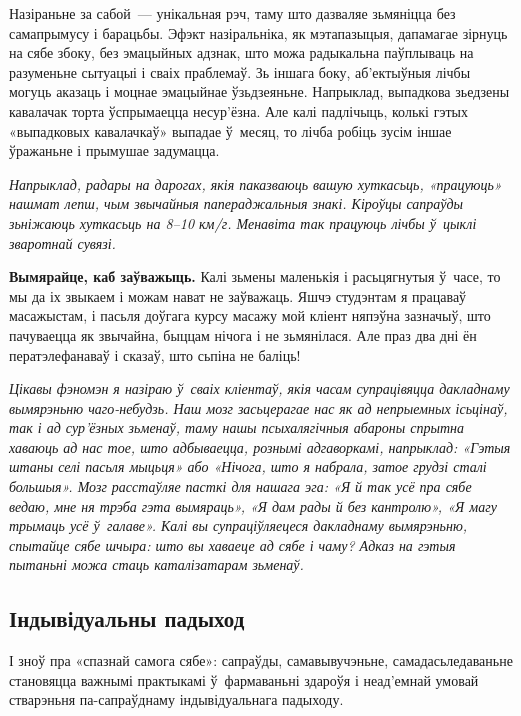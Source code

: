 Назіраньне за сабой~--- унікальная рэч, таму што дазваляе зьмяніцца без самапрымусу і барацьбы. Эфэкт назіральніка, як мэтапазыцыя, дапамагае зірнуць на сябе збоку, без эмацыйных адзнак, што можа радыкальна паўплываць на разуменьне сытуацыі і сваіх праблемаў. Зь іншага боку, аб'ектыўныя лічбы могуць аказаць і моцнае эмацыйнае ўзьдзеяньне. Напрыклад, выпадкова зьедзены кавалачак торта ўспрымаецца несур'ёзна. Але калі падлічыць, колькі гэтых «выпадковых кавалачкаў» выпадае ў~месяц, то лічба робіць зусім іншае ўражаньне і прымушае задумацца.

\emph{Напрыклад, радары на дарогах, якія паказваюць вашую хуткасьць, «працуюць» нашмат лепш, чым звычайныя папераджальныя знакі. Кіроўцы сапраўды зьніжаюць хуткасьць на 8--10 км/г. Менавіта так працуюць лічбы ў~цыклі зваротнай сувязі.}

\textbf{Вымярайце, каб заўважыць.} Калі зьмены маленькія і расьцягнутыя ў~часе, то мы да іх звыкаем і можам нават не заўважаць. Яшчэ студэнтам я працаваў масажыстам, і пасьля доўгага курсу масажу мой кліент няпэўна зазначыў, што пачуваецца як звычайна, быццам нічога і не зьмянілася. Але праз два дні ён ператэлефанаваў і сказаў, што сьпіна не баліць! 


\emph{Цікавы фэномэн я назіраю ў~сваіх кліентаў, якія часам супрацівяцца дакладнаму вымярэньню чаго-небудзь. Наш мозг засьцерагае нас як ад непрыемных ісьцінаў, так і ад сур'ёзных зьменаў, таму нашы псыхалягічныя абароны спрытна хаваюць ад нас тое, што адбываецца, рознымі адгаворкамі, напрыклад: «Гэтыя штаны селі пасьля мыцьця» або «Нічога, што я набрала, затое грудзі сталі большыя». Мозг расстаўляе пасткі для нашага эга: «Я й так усё пра сябе ведаю, мне ня трэба гэта вымяраць», «Я дам рады й без кантролю», «Я магу трымаць усё ў~галаве». Калі вы супраціўляецеся дакладнаму вымярэньню, спытайце сябе шчыра: што вы хаваеце ад сябе і чаму? Адказ на гэтыя пытаньні можа стаць каталізатарам зьменаў.}

\subsection*{Індывідуальны падыход}

І зноў пра «спазнай самога сябе»: сапраўды, самавывучэньне, самадасьледаваньне становяцца важнымі практыкамі ў~фармаваньні здароўя і неад'емнай умовай стварэньня па-сапраўднаму індывідуальнага падыходу.

